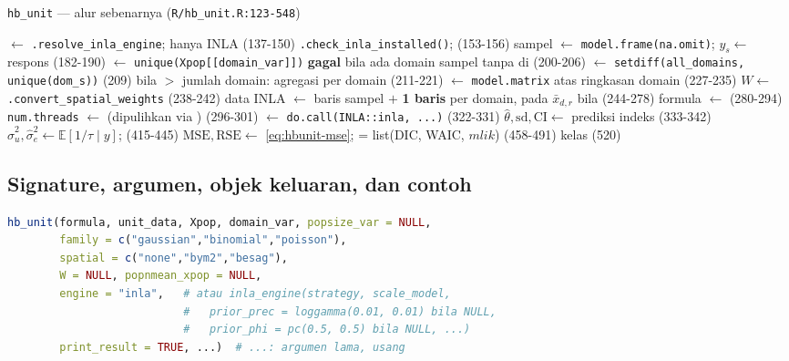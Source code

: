 \begin{algorithm}[htbp]
\caption{\texttt{hb\_unit} --- alur sebenarnya (\texttt{R/hb\_unit.R:123-548})}
\label{alg:hbunit}
 $\leftarrow$ \texttt{.resolve\_inla\_engine}; hanya INLA (137-150)\;
\texttt{.check\_inla\_installed()};\quad {} (153-156)\;
sampel $\leftarrow$ \texttt{model.frame(na.omit)}; $y_s\leftarrow$ respons (182-190)\;
 $\leftarrow$ \texttt{unique(Xpop[[domain\_var]])}\;
\textbf{gagal} bila ada domain sampel tanpa di  (200-206)\;
 $\leftarrow$ \texttt{setdiff(all\_domains, unique(dom\_s))} (209)\;
bila  $>$ jumlah domain: agregasi  per domain (211-221)\;
 $\leftarrow$ \texttt{model.matrix} atas ringkasan domain (227-235)\;
$W\leftarrow$ \texttt{.convert\_spatial\_weights} (238-242)\;
data INLA $\leftarrow$ baris sampel $+$ \textbf{1 baris } per domain, pada $\bar x_{d,r}$ bila  (244-278)\;
formula $\leftarrow$  (280-294)\;
\texttt{num.threads} $\leftarrow$  (dipulihkan via ) (296-301)\;
 $\leftarrow$ \texttt{do.call(INLA::inla, ...)} (322-331)\;
$\hat\theta,\mathrm{sd},\mathrm{CI}\leftarrow$ prediksi indeks  (333-342)\;
\;
$\hat\sigma_u^2,\hat\sigma_e^2\leftarrow\mathbb E[1/\tau\mid y]$;  (415-445)\;
$\mathrm{MSE},\mathrm{RSE}\leftarrow$ \eqref{eq:hbunit-mse};  = list(DIC, WAIC, $mlik$) (458-491)\;
kelas  (520)\;
\end{algorithm}

\subsection{Signature, argumen, objek keluaran, dan contoh}\label{sec:hbunit-api}

\begin{lstlisting}[language=R,caption={Signature \texttt{hb\_unit} (\texttt{R/hb\_unit.R:123-136}).}]
hb_unit(formula, unit_data, Xpop, domain_var, popsize_var = NULL,
        family = c("gaussian","binomial","poisson"),
        spatial = c("none","bym2","besag"),
        W = NULL, popnmean_xpop = NULL,
        engine = "inla",   # atau inla_engine(strategy, scale_model,
                           #   prior_prec = loggamma(0.01, 0.01) bila NULL,
                           #   prior_phi = pc(0.5, 0.5) bila NULL, ...)
        print_result = TRUE, ...)  # ...: argumen lama, usang
\end{lstlisting}

